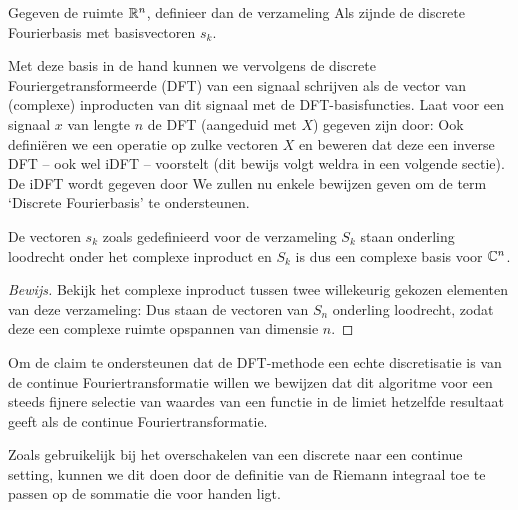 \begin{definitie} Gegeven de ruimte $\mathbb{R}^n$, definieer dan de verzameling
  Als zijnde de discrete Fourierbasis met basisvectoren $s_k$.
\end{definitie}
Met deze basis in de hand kunnen we vervolgens de discrete Fouriergetransformeerde (DFT) van een signaal schrijven als de vector van (complexe) inproducten van dit signaal met de DFT-basisfuncties. Laat voor een signaal $x$ van lengte $n$ de DFT (aangeduid met $X$) gegeven zijn door:
Ook defini\"eren we een operatie op zulke vectoren $X$ en beweren dat deze een inverse DFT -- ook wel iDFT -- voorstelt (dit bewijs volgt weldra in een volgende sectie). De iDFT wordt gegeven door
We zullen nu enkele bewijzen geven om de term `Discrete Fourierbasis' te ondersteunen.

\begin{stelling}[Fourierbasis]
  De vectoren $s_k$ zoals gedefinieerd voor de verzameling $S_k$ staan onderling loodrecht onder het complexe
  inproduct en $S_k$ is dus een complexe basis voor $\mathbb{C}^n$.
\end{stelling}
\begin{proof}[Bewijs]
  Bekijk het complexe inproduct tussen twee willekeurig gekozen elementen van deze verzameling:
  Dus staan de vectoren van $S_n$ onderling loodrecht, zodat deze een complexe ruimte opspannen van dimensie $n$.
\end{proof}

Om de claim te ondersteunen dat de DFT-methode een echte discretisatie is van de continue Fouriertransformatie willen we bewijzen dat dit algoritme voor een steeds fijnere selectie van waardes van een functie in de limiet hetzelfde resultaat geeft als de continue Fouriertransformatie.

Zoals gebruikelijk bij het overschakelen van een discrete naar een continue setting, kunnen we dit doen
door de definitie van de Riemann integraal toe te passen op de sommatie die voor handen ligt.

